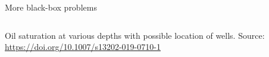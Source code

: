 \documentclass[11pt,compress,t,notes=noshow, xcolor=table]{beamer}
\begin{document}
\begin{vbframe}{More black-box problems}
\begin{columns}
\begin{column}{0.35\textwidth}
\begin{center}
			\begin{footnotesize}
				Oil saturation at various depths with possible location of wells.
				\newline
				\tiny{Source: \url{https://doi.org/10.1007/s13202-019-0710-1}}
			\end{footnotesize}
		\end{center}
	\end{column}
\end{columns}

\end{vbframe}
	


\endlecture
\end{document}

